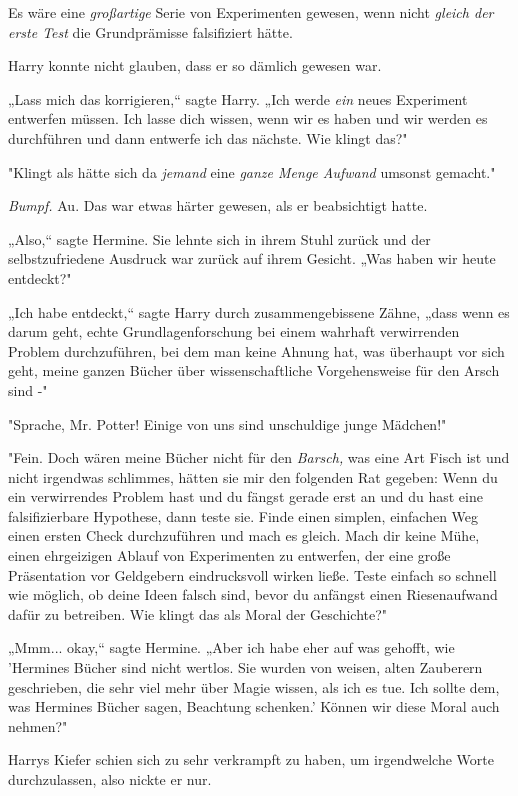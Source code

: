 {Es wäre eine \emph{großartige} Serie von Experimenten gewesen, wenn nicht \emph{gleich der erste Test} die Grundprämisse falsifiziert hätte.

Harry konnte nicht glauben, dass er so dämlich gewesen war.

„Lass mich das korrigieren,“ sagte Harry. „Ich werde \emph{ein} neues Experiment entwerfen müssen. Ich lasse dich wissen, wenn wir es haben und wir werden es durchführen und dann entwerfe ich das nächste. Wie klingt das?"

"Klingt als hätte sich da \emph{jemand} eine \emph{ganze Menge Aufwand} umsonst gemacht."

\emph{Bumpf.} Au. Das war etwas härter gewesen, als er beabsichtigt hatte.

„Also,“ sagte Hermine. Sie lehnte sich in ihrem Stuhl zurück und der selbstzufriedene Ausdruck war zurück auf ihrem Gesicht. „Was haben wir heute entdeckt?"

„Ich habe entdeckt,“ sagte Harry durch zusammengebissene Zähne, „dass wenn es darum geht, echte Grundlagenforschung bei einem wahrhaft verwirrenden Problem durchzuführen, bei dem man keine Ahnung hat, was überhaupt vor sich geht, meine ganzen Bücher über wissenschaftliche Vorgehensweise für den Arsch sind -"

"Sprache, Mr. Potter! Einige von uns sind unschuldige junge Mädchen!"

"Fein. Doch wären meine Bücher nicht für den \emph{Barsch,} was eine Art Fisch ist und nicht irgendwas schlimmes, hätten sie mir den folgenden Rat gegeben: Wenn du ein verwirrendes Problem hast und du fängst gerade erst an und du hast eine falsifizierbare Hypothese, dann teste sie. Finde einen simplen, einfachen Weg einen ersten Check durchzuführen und mach es gleich. Mach dir keine Mühe, einen ehrgeizigen Ablauf von Experimenten zu entwerfen, der eine große Präsentation vor Geldgebern eindrucksvoll wirken ließe. Teste einfach so schnell wie möglich, ob deine Ideen falsch sind, bevor du anfängst einen Riesenaufwand dafür zu betreiben. Wie klingt das als Moral der Geschichte?"

„Mmm... okay,“ sagte Hermine. „Aber ich habe eher auf was gehofft, wie 'Hermines Bücher sind nicht wertlos. Sie wurden von weisen, alten Zauberern geschrieben, die sehr viel mehr über Magie wissen, als ich es tue. Ich sollte dem, was Hermines Bücher sagen, Beachtung schenken.' Können wir diese Moral auch nehmen?"

Harrys Kiefer schien sich zu sehr verkrampft zu haben, um irgendwelche Worte durchzulassen, also nickte er nur.

}
